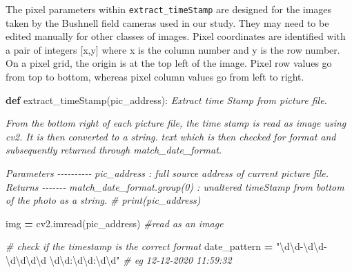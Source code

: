 \documentclass[
]{article}
\newenvironment{Shaded}{\begin{snugshade}}{\end{snugshade}}
\newcommand{\CommentTok}[1]{\textcolor[rgb]{0.56,0.35,0.01}{\textit{#1}}}
\newcommand{\KeywordTok}[1]{\textcolor[rgb]{0.13,0.29,0.53}{\textbf{#1}}}
\newcommand{\NormalTok}[1]{#1}
\newcommand{\OperatorTok}[1]{\textcolor[rgb]{0.81,0.36,0.00}{\textbf{#1}}}
\newcommand{\StringTok}[1]{\textcolor[rgb]{0.31,0.60,0.02}{#1}}
\begin{document}
The pixel parameters within \texttt{extract\_timeStamp} are designed for the images taken by the Bushnell field cameras used in our study. They may need to be edited manually for other classes of images. Pixel coordinates are identified with a pair of integers {[}x,y{]} where x is the column number and y is the row number. On a pixel grid, the origin is at the top left of the image. Pixel row values go from top to bottom, whereas pixel column values go from left to right.

\begin{Shaded}
\begin{Highlighting}[]
\KeywordTok{def}\NormalTok{ extract\_timeStamp(pic\_address):}
    \CommentTok{\textquotesingle{}\textquotesingle{}\textquotesingle{}}
\CommentTok{    Extract time Stamp from picture file.}

\CommentTok{    From the bottom right of each picture file, the time stamp is read as image using cv2. It is then converted to a string.}
\CommentTok{    text which is then checked for format and subsequently returned through match\_date\_format.}

\CommentTok{    Parameters}
\CommentTok{    {-}{-}{-}{-}{-}{-}{-}{-}{-}{-}}
\CommentTok{    pic\_address : full source address of current picture file.}
\CommentTok{    Returns}
\CommentTok{    {-}{-}{-}{-}{-}{-}{-}}
\CommentTok{    match\_date\_format.group(0) : unaltered timeStamp from bottom of the photo as a string.}
\CommentTok{    \textquotesingle{}\textquotesingle{}\textquotesingle{}}
    \CommentTok{\# print(pic\_address)}

\NormalTok{    img }\OperatorTok{=}\NormalTok{ cv2.imread(pic\_address) }\CommentTok{\#read as an image}

    \CommentTok{\# check if the timestamp is the correct format}
\NormalTok{    date\_pattern }\OperatorTok{=} \StringTok{"\textbackslash{}d\textbackslash{}d{-}\textbackslash{}d\textbackslash{}d{-}\textbackslash{}d\textbackslash{}d\textbackslash{}d\textbackslash{}d \textbackslash{}d\textbackslash{}d:\textbackslash{}d\textbackslash{}d:\textbackslash{}d\textbackslash{}d"} \CommentTok{\# eg 12{-}12{-}2020 11:59:32}


\end{Highlighting}
\end{Shaded}
\end{document}
